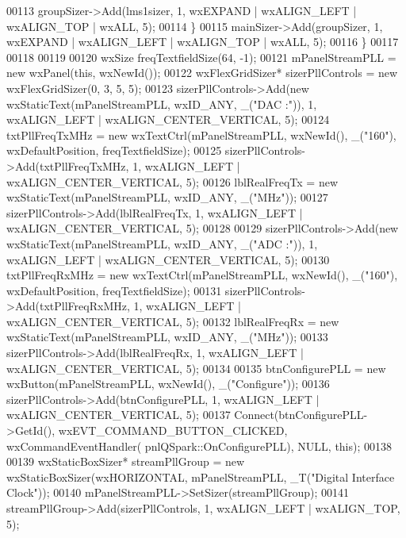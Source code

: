 \begin{DoxyCode}
00113             groupSizer->Add(lms1sizer, 1, wxEXPAND | wxALIGN\_LEFT | wxALIGN\_TOP |  wxALL, 5);
00114         \}
00115         mainSizer->Add(groupSizer, 1, wxEXPAND | wxALIGN\_LEFT | wxALIGN\_TOP | wxALL, 5);
00116     \}
00117 
00118 
00119 
00120     wxSize freqTextfieldSize(64, -1);
00121     mPanelStreamPLL = \textcolor{keyword}{new} wxPanel(\textcolor{keyword}{this}, wxNewId());
00122     wxFlexGridSizer* sizerPllControls = \textcolor{keyword}{new} wxFlexGridSizer(0, 3, 5, 5);
00123     sizerPllControls->Add(\textcolor{keyword}{new} wxStaticText(mPanelStreamPLL, wxID\_ANY, \_(\textcolor{stringliteral}{"DAC :"})), 1, wxALIGN\_LEFT | 
      wxALIGN\_CENTER\_VERTICAL, 5);
00124     txtPllFreqTxMHz = \textcolor{keyword}{new} wxTextCtrl(mPanelStreamPLL, wxNewId(), \_(\textcolor{stringliteral}{"160"}), wxDefaultPosition, 
      freqTextfieldSize);
00125     sizerPllControls->Add(txtPllFreqTxMHz, 1, wxALIGN\_LEFT | wxALIGN\_CENTER\_VERTICAL, 5);
00126     lblRealFreqTx = \textcolor{keyword}{new} wxStaticText(mPanelStreamPLL, wxID\_ANY, \_(\textcolor{stringliteral}{"MHz"}));
00127     sizerPllControls->Add(lblRealFreqTx, 1, wxALIGN\_LEFT | wxALIGN\_CENTER\_VERTICAL, 5);
00128 
00129     sizerPllControls->Add(\textcolor{keyword}{new} wxStaticText(mPanelStreamPLL, wxID\_ANY, \_(\textcolor{stringliteral}{"ADC :"})), 1, wxALIGN\_LEFT | 
      wxALIGN\_CENTER\_VERTICAL, 5);
00130     txtPllFreqRxMHz = \textcolor{keyword}{new} wxTextCtrl(mPanelStreamPLL, wxNewId(), \_(\textcolor{stringliteral}{"160"}), wxDefaultPosition, 
      freqTextfieldSize);
00131     sizerPllControls->Add(txtPllFreqRxMHz, 1, wxALIGN\_LEFT | wxALIGN\_CENTER\_VERTICAL, 5);
00132     lblRealFreqRx = \textcolor{keyword}{new} wxStaticText(mPanelStreamPLL, wxID\_ANY, \_(\textcolor{stringliteral}{"MHz"}));
00133     sizerPllControls->Add(lblRealFreqRx, 1, wxALIGN\_LEFT | wxALIGN\_CENTER\_VERTICAL, 5);
00134 
00135     btnConfigurePLL = \textcolor{keyword}{new} wxButton(mPanelStreamPLL, wxNewId(), \_(\textcolor{stringliteral}{"Configure"}));
00136     sizerPllControls->Add(btnConfigurePLL, 1, wxALIGN\_LEFT | wxALIGN\_CENTER\_VERTICAL, 5);
00137     Connect(btnConfigurePLL->GetId(), wxEVT\_COMMAND\_BUTTON\_CLICKED, wxCommandEventHandler(
      pnlQSpark::OnConfigurePLL), NULL, \textcolor{keyword}{this});
00138 
00139     wxStaticBoxSizer* streamPllGroup = \textcolor{keyword}{new} wxStaticBoxSizer(wxHORIZONTAL, 
      mPanelStreamPLL, \_T(\textcolor{stringliteral}{"Digital Interface Clock"}));
00140     mPanelStreamPLL->SetSizer(streamPllGroup);
00141     streamPllGroup->Add(sizerPllControls, 1, wxALIGN\_LEFT | wxALIGN\_TOP, 5);

\end{DoxyCode}
